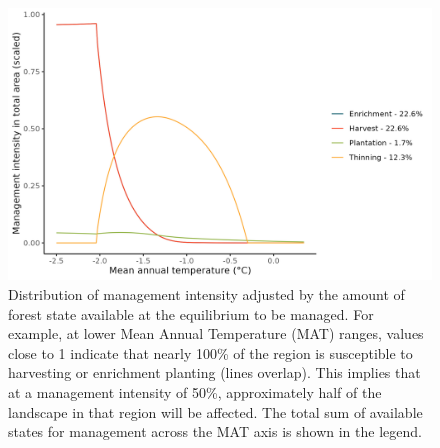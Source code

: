 \hypertarget{fig:sim-result-sup8_ch1}{%
\begin{figure}
\centering
\includegraphics{manuscript/img/num-result_supp5.png}
\caption[{Distribution of management intensity adjusted by the amount of
forest state available at the equilibrium to be managed.}]{Distribution
of management intensity adjusted by the amount of forest state available
at the equilibrium to be managed. For example, at lower Mean Annual
Temperature (MAT) ranges, values close to 1 indicate that nearly 100\%
of the region is susceptible to harvesting or enrichment planting (lines
overlap). This implies that at a management intensity of 50\%,
approximately half of the landscape in that region will be affected. The
total sum of available states for management across the MAT axis is
shown in the legend.}
\label{fig:sim-result-sup8_ch1}
\end{figure}
}

\singlespacing
{\renewcommand{\bibname}{References}
\renewcommand{\bibsection}{\section{\bibname}}
}

